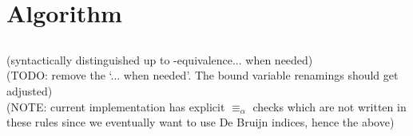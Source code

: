 \documentclass[11pt]{article}
\newcounter{counter}
\newcommand*{\hyph}{\text{-}}
\renewcommand*{\rule}[1][(\thecounter)\refstepcounter{counter}]{\inferrule*[vcenter,rightstyle=\texttt,right=$\mathtt{#1}$]}
\begin{document}
    \subsection*{}
        \begin{minipage}{\textwidth}
        \end{minipage}
    \subsection*{}
        \begin{minipage}{\textwidth}
        \end{minipage}
\section{Algorithm}
    \subsection*{}
    (syntactically distinguished up to \alpha-equivalence... when needed) \\
    (TODO: remove the `... when needed'. The bound variable renamings should get adjusted) \\
    (NOTE: current implementation has explicit $\equiv_\alpha$ checks which are not written in these rules since we eventually want to use De Bruijn indices, hence the above)
\end{document}

